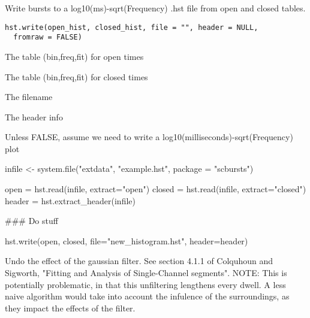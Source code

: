 \documentclass[letterpaper]{book}
\begin{document}
%
\begin{Description}\relax
Write bursts to a log10(ms)-sqrt(Frequency) .hst file from open and closed tables.
\end{Description}
%
\begin{Usage}
\begin{verbatim}
hst.write(open_hist, closed_hist, file = "", header = NULL,
  fromraw = FALSE)
\end{verbatim}
\end{Usage}
%
\begin{Arguments}
\begin{ldescription}
\item[\code{open\_hist}] The table (bin,freq,fit) for open times

\item[\code{closed\_hist}] The table (bin,freq,fit) for closed times

\item[\code{file}] The filename

\item[\code{header}] The header info

\item[\code{fromraw}] Unless FALSE, assume we need to write a log10(milliseconds)-sqrt(Frequency) plot
\end{ldescription}
\end{Arguments}
%
\begin{Examples}
\begin{ExampleCode}

infile <- system.file("extdata", "example.hst", package = "scbursts")

open = hst.read(infile, extract="open")
closed = hst.read(infile, extract="closed")
header = hst.extract_header(infile)

### Do stuff

hst.write(open, closed, file="new_histogram.hst", header=header)

\end{ExampleCode}
\end{Examples}
%
\begin{Description}\relax
Undo the effect of the gaussian filter. See section 4.1.1 of Colquhoun and Sigworth, "Fitting and Analysis of Single-Channel segments". NOTE: This is potentially problematic, in that this unfiltering lengthens every dwell. A less naive algorithm would take into account the infulence of the surroundings, as they impact the effects of the filter.
\end{Description}
\end{document}
